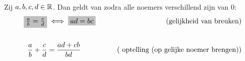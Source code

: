 \documentclass{ximera}
\begin{document}
\begin{proposition}\label{samenvatting:breuken} \ 
	
	Zij $a,b,c,d\in \mathbb{R}$. Dan geldt van zodra alle noemers verschillend zijn van $0$:
	\begin{align*}
		\important{\frac{a}{b} = \frac{c}{d}}  &\iff \important{ad = bc} 
        & \tag{gelijkheid van breuken}\label{samenvatting: gelijkheid breuken}\\ \\
\frac{a}{b}+\frac{c}{d} &= \frac{ad+cb}{bd} 
        & \tag{ optelling (op gelijke noemer brengen)}\label{samenvatting:optelling breuken} \\ \\
	\end{align*}
\end{proposition}
\end{document}
